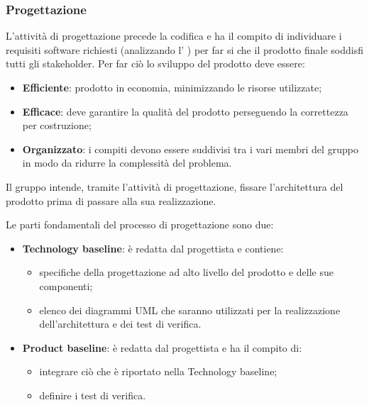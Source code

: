 \subsubsection{Progettazione}
L'attività di progettazione precede la codifica e ha il compito di individuare i requisiti software richiesti (analizzando l' ) per far si che il prodotto finale soddisfi tutti gli stakeholder. Per far ciò lo sviluppo del prodotto deve essere:
\begin{itemize}
\item \textbf{Efficiente}: prodotto in economia, minimizzando le risorse utilizzate;
\item \textbf{Efficace}: deve garantire la qualità del prodotto perseguendo la correttezza per costruzione;
\item \textbf{Organizzato}: i compiti devono essere suddivisi tra i vari membri del gruppo in modo da ridurre la complessità del problema.
\end{itemize}

Il gruppo \Omicron{} intende, tramite l'attività di progettazione, fissare l'architettura del prodotto prima di passare alla sua realizzazione. 

Le parti fondamentali del processo di progettazione sono due:
\begin{itemize}
\item \textbf{Technology baseline}: è redatta dal progettista e contiene:
\begin{itemize}
\item specifiche della progettazione ad alto livello del prodotto e delle sue componenti;
\item elenco dei diagrammi UML che saranno utilizzati per la realizzazione dell'architettura e dei test di verifica.
\end{itemize}
\item \textbf{Product baseline}: è redatta dal progettista e ha il compito di:
\begin{itemize}
\item integrare ciò che è riportato nella Technology baseline;
\item definire i test di verifica.
\end{itemize}
\end{itemize} 

